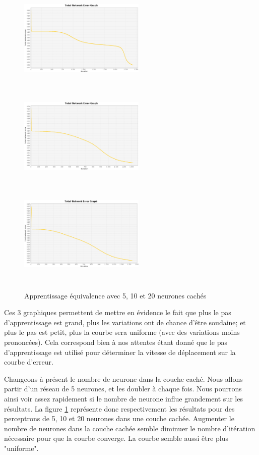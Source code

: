 \documentclass[twoside,openright,a4paper,11pt,french]{article}
\begin{document}
\begin{figure}[ht]
\centering
\includegraphics[width=6cm,height=5cm]{./pics/eq/multi-5_eq_def.eps}
\includegraphics[width=6cm,height=5cm]{./pics/eq/multi-10_eq_def.eps}
\includegraphics[width=6cm,height=5cm]{./pics/eq/multi-20_eq_def.eps}
\caption{Apprentissage équivalence avec 5, 10 et 20 neurones cachés}
\label{fig:eqmult51020}
\end{figure}
\clearpage

Ces 3 graphiques permettent de mettre en évidence le fait que plus le pas
d'apprentissage est grand, plus les variations ont de chance d'être soudaine;
et plus le pas est petit, plus la courbe sera uniforme (avec des variations
moins prononcées). Cela correspond bien à nos attentes étant donné que le 
pas d'apprentissage est utilisé pour déterminer la vitesse de déplacement
sur la courbe d'erreur.  

Changeons à présent le nombre de neurone dans la couche caché.  Nous allons
partir d'un réseau de 5 neurones, et les doubler à chaque fois. Nous
pourrons ainsi voir assez rapidement si le nombre de neurone influe grandement
sur les résultats. La figure \ref{fig:eqmult51020} représente donc
respectivement les résultats pour des perceptrons de 5, 10 et 20 neurones dans
une couche cachée.
Augmenter le nombre de neurones dans la couche cachée semble diminuer le nombre
d'itération nécessaire pour que la courbe converge.
La courbe semble aussi être plus "uniforme".
\end{document}
